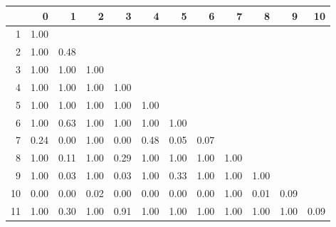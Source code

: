 % 
\begin{tabular}{rrrrrrrrrrrr}
  \hline
 & 0 & 1 & 2 & 3 & 4 & 5 & 6 & 7 & 8 & 9 & 10 \\ 
  \hline
1 & 1.00 &  &  &  &  &  &  &  &  &  &  \\ 
  2 & 1.00 & 0.48 &  &  &  &  &  &  &  &  &  \\ 
  3 & 1.00 & 1.00 & 1.00 &  &  &  &  &  &  &  &  \\ 
  4 & 1.00 & 1.00 & 1.00 & 1.00 &  &  &  &  &  &  &  \\ 
  5 & 1.00 & 1.00 & 1.00 & 1.00 & 1.00 &  &  &  &  &  &  \\ 
  6 & 1.00 & 0.63 & 1.00 & 1.00 & 1.00 & 1.00 &  &  &  &  &  \\ 
  7 & 0.24 & 0.00 & 1.00 & 0.00 & 0.48 & 0.05 & 0.07 &  &  &  &  \\ 
  8 & 1.00 & 0.11 & 1.00 & 0.29 & 1.00 & 1.00 & 1.00 & 1.00 &  &  &  \\ 
  9 & 1.00 & 0.03 & 1.00 & 0.03 & 1.00 & 0.33 & 1.00 & 1.00 & 1.00 &  &  \\ 
  10 & 0.00 & 0.00 & 0.02 & 0.00 & 0.00 & 0.00 & 0.00 & 1.00 & 0.01 & 0.09 &  \\ 
  11 & 1.00 & 0.30 & 1.00 & 0.91 & 1.00 & 1.00 & 1.00 & 1.00 & 1.00 & 1.00 & 0.09 \\ 
   \hline
\end{tabular}
% 
